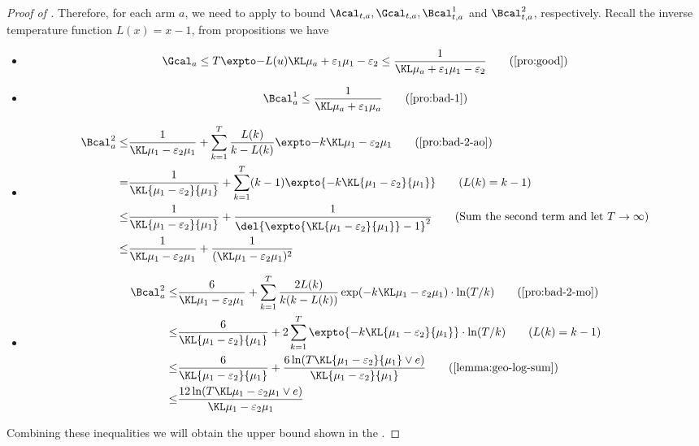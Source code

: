 \begin{proof}[Proof of ]
    Therefore, for each arm $a$, we need to apply  to bound $\Acal_{t,a}, \Gcal_{t,a}, \Bcal^1_{t,a}$ and $\Bcal^2_{t,a}$, respectively. 
    Recall the inverse temperature function $L(x) = x - 1$, from propositions we have
    \begin{itemize}
        \item 
        \[
            \Gcal_a 
            \leq \ExpFOne \leq \GoodEventBound 
                \tag{\Cref{pro:good}}
        \]
        \item
        \[
            \Bcal_a^1 
            \leq \ExpFTwo
                \tag{\Cref{pro:bad-1}}
        \]
        \item
        \begin{align*}
            \Bcal_a^2
            \leq& \ExpFThreeAO 
                \tag{\Cref{pro:bad-2-ao}}
            \\
            =& \frac{1}{\KL{\mu_1-\varepsilon_2}{\mu_1}} + \sum_{k=1}^T (k-1) \expto{-k \KL{\mu_1-\varepsilon_2}{\mu_1}}
                \tag{$L(k) = k-1$}
            \\
            \leq& \frac{1}{\KL{\mu_1-\varepsilon_2}{\mu_1}} + \frac{1}{ \del{\expto{\KL{\mu_1-\varepsilon_2}{\mu_1}} - 1}^2 }
                \tag{Sum the second term and let $T \to \infty$}
            \\
            \leq& \BadEventThreeBoundForAO
        \end{align*}
        \item
        \begin{align*}
            \Bcal_a^2
            \leq& \ExpFThreeMO 
                \tag{\Cref{pro:bad-2-mo}}
            \\
            \leq& \frac{6}{\KL{\mu_1-\varepsilon_2}{\mu_1}} + 2 \sum_{k=1}^T \expto{-k \KL{\mu_1-\varepsilon_2}{\mu_1}} \cdot \ln(T/k) 
                \tag{$L(k) = k-1$}
            \\
            \leq& \frac{6}{\KL{\mu_1-\varepsilon_2}{\mu_1}} + \frac{6\ln(T\KL{\mu_1-\varepsilon_2}{\mu_1} \vee e)}{\KL{\mu_1-\varepsilon_2}{\mu_1}} 
                \tag{\Cref{lemma:geo-log-sum}} 
            \\
            \leq& \BadEventThreeBoundForMO
        \end{align*}
    \end{itemize}
 
    Combining these inequalities we will obtain the upper bound shown in the .
\end{proof}


